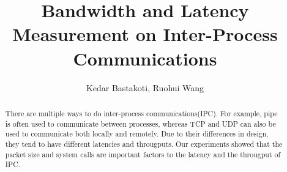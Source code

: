 \documentclass[10pt]{article}
\begin{document}
\title{Bandwidth and Latency Measurement on Inter-Process Communications}
\author{Kedar Bastakoti, Ruohui Wang}
\date{}

\maketitle

\begin{abstract}
    There are multiple ways to do inter-process communications(IPC). For example, pipe is often used to communicate between processes, whereas TCP and UDP can also be used to communicate both locally and remotely. Due to their differences in design, they tend to have different latencies and througputs. Our experiments showed that the packet size and system calls are important factors to the latency and the througput of IPC.
\end{abstract}










    
\end{document}
